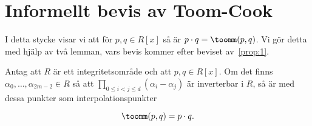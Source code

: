\section{Informellt bevis av Toom-Cook}
\label{sec:informhuvudbevis}
I detta stycke visar vi att för $p, q \in R[x]$ så är
$p \cdot q = \toomm (p, q)$. Vi gör detta med hjälp av två lemman, vars bevis
kommer efter beviset av~\ref{prop:1}.

\begin{proposition}
  \label{prop:1}
  Antag att $R$ är ett integritetsområde och att $p, q \in R[x]$. Om det finns
  $\alpha_0, \dots, \alpha_{2m-2} \in R$ så att $\prod_{0 \leq i < j \leq d}
  (\alpha_i - \alpha_j)$ är inverterbar i $R$, så är med dessa punkter som
  interpolationspunkter

  \begin{equation}
    \label{eq:name7}
    \toomm (p, q) = p \cdot q.
  \end{equation}
\end{proposition}

